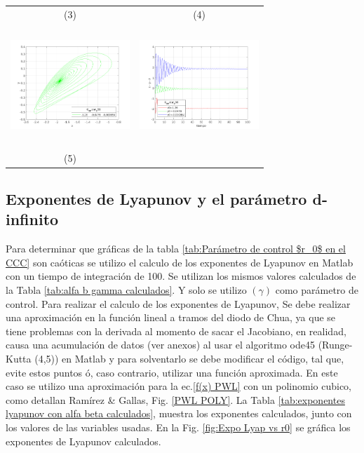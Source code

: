 \documentclass{rbf}
\begin{document}
\begin{table}[h]
\begin{tabular}{c c}
        (3) & (4) \\
        \includegraphics[width=4.5cm,height=4.5cm]{Mat_C_R_r0_poly1/phaseESPACEC_R_Polyr_056.png}&
        \includegraphics[width=4.5cm,height=4.5cm]{Mat_C_R_r0_poly1/timeseriesC_R_Polyr_056.png}\\
        (5) \\
    \end{tabular}
\end{table}

\subsection{Exponentes de Lyapunov y el parámetro d-infinito}

Para determinar que gráficas de la tabla \ref{tab:Parámetro de control $r_0$ en el CCC} son caóticas se utilizo el calculo de los exponentes de Lyapunov en Matlab con un tiempo de integración de 100. Se utilizan los mismos valores calculados de la Tabla \ref{tab:alfa b gamma calculados}. Y solo se utilizo $(\gamma)$ como parámetro de control.
Para realizar el calculo de los exponentes de Lyapunov, Se debe realizar una aproximación en la función lineal a tramos del diodo de Chua, ya que se tiene problemas con la derivada al momento de sacar el Jacobiano, en realidad, causa una acumulación de datos (ver anexos) al usar el algoritmo ode45 (Runge-Kutta (4,5)) en Matlab y para solventarlo se debe modificar el código, tal que, evite estos puntos ó, caso contrario, utilizar una función aproximada. En este caso se utilizo una aproximación para la ec.\ref{f(x) PWL} con un polinomio cubico, como detallan Ramírez & Gallas, Fig. \ref{PWL POLY}.
La Tabla \ref{tab:exponentes lyapunov con alfa beta calculados}, muestra los exponentes calculados, junto con los valores de las variables usadas. En la Fig. \ref{fig:Expo Lyap vs r0} se gráfica los exponentes de Lyapunov calculados.
\end{document}

